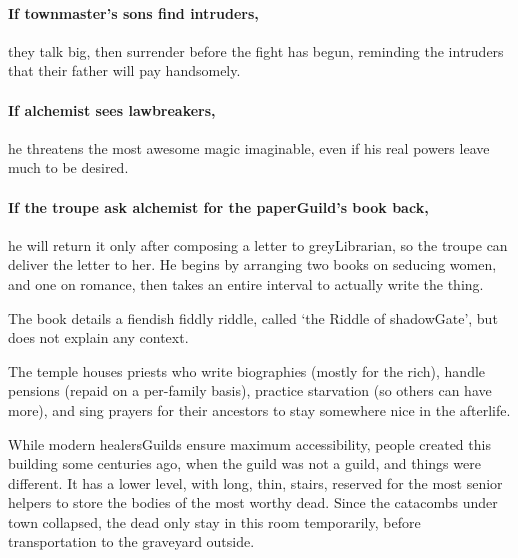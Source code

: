 \begin{multicols}{2}
\paragraph{If \gls{townmaster}'s sons find intruders,}
they talk big, then surrender before the fight has begun, reminding the intruders that their father will pay handsomely.

\citadelAlchemist
\label{citadel_alchemist}

\showStdSpells

\paragraph{If \gls{alchemist} sees lawbreakers,}
he threatens the most awesome magic imaginable, even if his real powers leave much to be desired.

\paragraph{If the troupe ask \gls{alchemist} for the \gls{paperGuild}'s book back,}
he will return it only after composing a letter to \gls{greyLibrarian}, so the troupe can deliver the letter to her.
He begins by arranging two books on seducing women, and one on romance, then takes an entire \gls{interval} to actually write the thing. 

The book details a fiendish fiddly riddle, called `the Riddle of \gls{shadowGate}', but does not explain any context.


\label{hardestRiddle}
\hardestRiddleEver



The temple houses priests who write biographies (mostly for the rich), handle pensions (repaid on a per-family basis), practice starvation (so others can have more), and sing prayers for their ancestors to stay somewhere nice in the afterlife.

While modern \glspl{healersGuild} ensure maximum accessibility, people created this building some centuries ago, when the guild was not a guild, and things were different.
It has a lower level, with long, thin, stairs, reserved for the most senior \glspl{helper} to store the bodies of the most worthy dead.
Since the catacombs under \gls{town} collapsed, the dead only stay in this room temporarily, before transportation to the graveyard outside.


\end{multicols}
